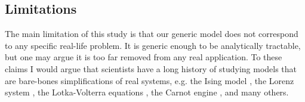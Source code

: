 \subsection{Limitations}\label{subsec:limitations}
The main limitation of this study is that our generic model does not
correspond to any specific real-life problem. It is generic enough to
be analytically tractable, but one may argue it is too far removed
from any real application. To these claims I would argue that
scientists have a long history of studying models that are bare-bones
simplifications of real systems, e.g. the Ising model
\cite{cipra1987}, the Lorenz system \cite{brin}, the Lotka-Volterra
equations \cite{logan2006}, the Carnot engine \cite{kardar2007}, and
many others.


